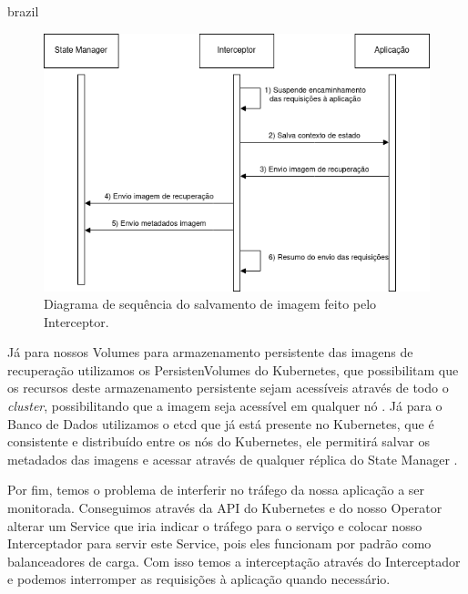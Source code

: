 \begin{otherlanguage*}{brazil}
\begin{figure}[h]
\centering
\includegraphics[scale=0.64]{images/interceptor-checkpoint.png}
\caption{Diagrama de sequência do salvamento de imagem feito pelo Interceptor.}
\label{fig:interceptor-checkpoint}
\end{figure}

Já para nossos Volumes para armazenamento persistente das imagens de recuperação
utilizamos os PersistenVolumes do Kubernetes, que possibilitam que os recursos
deste armazenamento persistente sejam acessíveis através de todo o \textit{cluster},
possibilitando que a imagem seja acessível em qualquer nó \cite{kubernetes:persistent-volumes}.
Já para o Banco de Dados utilizamos o etcd que já está presente no Kubernetes, que é
consistente e distribuído entre os nós do Kubernetes, ele permitirá salvar os metadados
das imagens e acessar através de qualquer réplica do State Manager \cite{etcd}
\cite{kubernetes:etcd}.

Por fim, temos o problema de interferir no tráfego da nossa aplicação a ser monitorada.
Conseguimos através da API do Kubernetes e do nosso Operator alterar um Service que iria
indicar o tráfego para o serviço e colocar nosso Interceptador para servir este Service,
pois eles funcionam por padrão como balanceadores de carga. Com isso temos a interceptação
através do Interceptador e podemos interromper as requisições à aplicação quando necessário.

\end{otherlanguage*}
